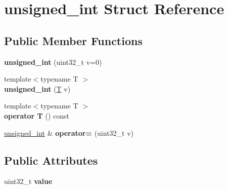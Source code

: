 \hypertarget{structunsigned__int}{}\section{unsigned\+\_\+int Struct Reference}
\label{structunsigned__int}
\subsection*{Public Member Functions}
\begin{DoxyCompactItemize}
\item 
\mbox{\label{structunsigned__int_aaaeee21167478df0b454f001d0567cd7}} 
{\bfseries unsigned\+\_\+int} (uint32\+\_\+t v=0)
\item 
\mbox{\label{structunsigned__int_adda0360df1de313f0df5c5570aebdfdd}} 
{\footnotesize template$<$typename T $>$ }\\{\bfseries unsigned\+\_\+int} (\mbox{\hyperlink{struct_t}{T}} v)
\item 
\mbox{\label{structunsigned__int_a5627f0b22068d1761f2e416e7ae64a3c}} 
{\footnotesize template$<$typename T $>$ }\\{\bfseries operator T} () const
\item 
\mbox{\label{structunsigned__int_a7d9250cd41ed15bd3b04a1f003f41154}} 
\mbox{\hyperlink{structunsigned__int}{unsigned\+\_\+int}} \& {\bfseries operator=} (uint32\+\_\+t v)
\end{DoxyCompactItemize}
\subsection*{Public Attributes}
\begin{DoxyCompactItemize}
\item 
\mbox{\label{structunsigned__int_a247200b83e3cb2019efb8569a7e3937a}} 
uint32\+\_\+t {\bfseries value}
\end{DoxyCompactItemize}
